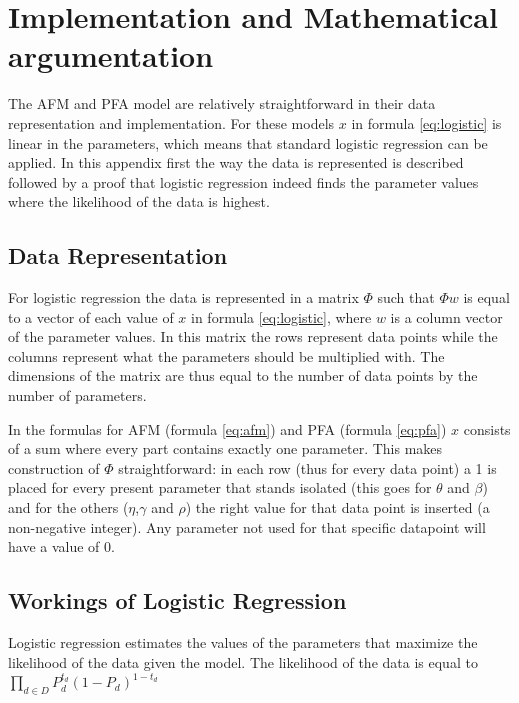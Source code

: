 \documentclass{scrartcl}
\begin{document}
\section{Implementation and Mathematical argumentation}
\label{app:math}
The AFM and PFA model are relatively straightforward in their data representation and implementation. For these models $x$ in formula \ref{eq:logistic} is linear in the parameters, which means that standard logistic regression can be applied. In this appendix first the way the data is represented is described followed by a proof that logistic regression indeed finds the parameter values where the likelihood of the data is highest. 
\subsection{Data Representation}
For logistic regression the data is represented in a matrix $\Phi$ such that $\Phi w$ is equal to a vector of each value of $x$ in formula \ref{eq:logistic}, where $w$ is a column vector of the parameter values. 
In this matrix the rows represent data points while the columns represent what the parameters should be multiplied with. The dimensions of the matrix are thus equal to the number of data points by the number of parameters.

In the formulas for AFM (formula \ref{eq:afm}) and PFA (formula \ref{eq:pfa}) $x$ consists of a sum where every part contains exactly one parameter. This makes construction of $\Phi$ straightforward: in each row (thus for every data point) a 1 is placed for every present parameter that stands isolated (this goes for $\theta$ and $\beta$) and for the others ($\eta$,$\gamma$ and $\rho$) the right value for that data point is inserted (a non-negative integer). Any parameter not used for that specific datapoint will have a value of 0.

\subsection{Workings of Logistic Regression}
Logistic regression estimates the values of the parameters that maximize the likelihood of the data given the model. The likelihood of the data is equal to $\prod_{d \in D} P_{d}^{t_d}  (1- P_{d})^{1-t_d} $

\pagebreak 
\end{document}
